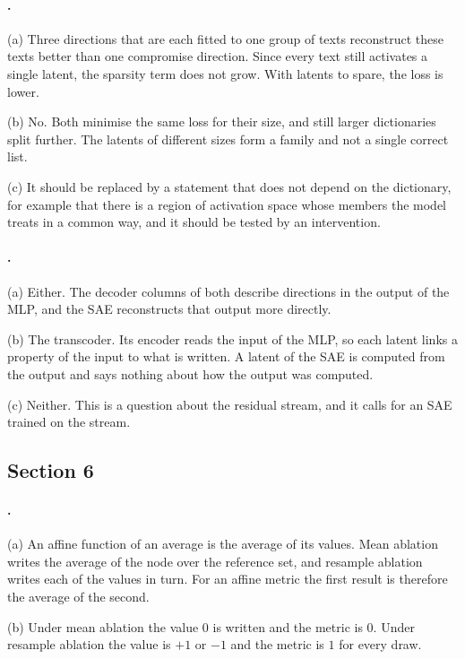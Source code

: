 {\paragraph{.}
(a) Three directions that are each fitted to one group of texts reconstruct these texts better than one
compromise direction. Since every text still activates a single latent, the sparsity term does not grow. With
latents to spare, the loss is lower.

(b) No. Both minimise the same loss for their size, and still larger dictionaries split further. The latents of
different sizes form a family and not a single correct list.

(c) It should be replaced by a statement that does not depend on the dictionary, for example that there is a
region of activation space whose members the model treats in a common way, and it should be tested by an
intervention.

\paragraph{.}
(a) Either. The decoder columns of both describe directions in the output of the MLP, and the SAE reconstructs
that output more directly.

(b) The transcoder. Its encoder reads the input of the MLP, so each latent links a property of the input to what
is written. A latent of the SAE is computed from the output and says nothing about how the output was computed.

(c) Neither. This is a question about the residual stream, and it calls for an SAE trained on the stream.

\subsection*{Section 6}

\paragraph{.}
(a) An affine function of an average is the average of its values. Mean ablation writes the average of the node
over the reference set, and resample ablation writes each of the values in turn. For an affine metric the first
result is therefore the average of the second.

(b) Under mean ablation the value $0$ is written and the metric is $0$. Under resample ablation the value is $+1$
or $-1$ and the metric is $1$ for every draw.

}
